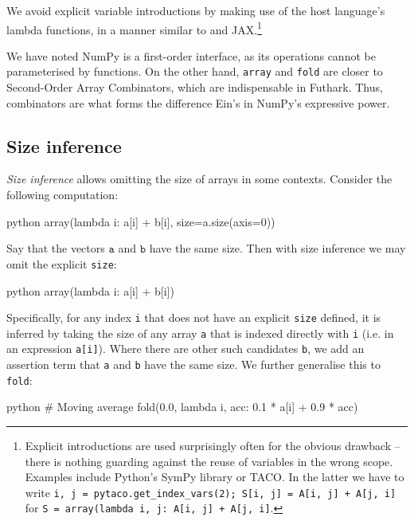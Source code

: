 We avoid explicit variable introductions by making use of the host language's lambda functions, in a manner similar to \textcite{atkey2009unembedding} and JAX.\footnote{Explicit introductions are used surprisingly often for the obvious drawback -- there is nothing guarding against the reuse of variables in the wrong scope. Examples include Python's SymPy library or TACO. In the latter we have to write \texttt{i, j = pytaco.get_index_vars(2); S[i, j] = A[i, j] + A[j, i]} for \texttt{S = array(lambda i, j: A[i, j] + A[j, i]}.}

We have noted NumPy is a first-order interface, as its operations cannot be parameterised by functions. On the other hand, \texttt{array} and \texttt{fold} are closer to Second-Order Array Combinators, which are indispensable in Futhark.
Thus, combinators are what forms the difference Ein's in NumPy's expressive power.



\subsection{Size inference}

\textit{Size inference} allows omitting the size of arrays in some contexts. Consider the following computation:
\begin{center} 
\begin{cminted}{python}
array(lambda i: a[i] + b[i], size=a.size(axis=0))
\end{cminted} 
\end{center}
Say that the vectors $\texttt{a}$ and $\texttt{b}$ have the same size. Then with size inference we may omit the explicit \texttt{size}:
\begin{center} 
\begin{cminted}{python}
array(lambda i: a[i] + b[i])
\end{cminted} 
\end{center}
Specifically, for any index \texttt{i} that does not have an explicit \texttt{size} defined, it is inferred by taking the size of any array \texttt{a} that is indexed directly with \texttt{i} (i.e. in an expression \texttt{a[i]}). 
Where there are other such candidates \texttt{b}, we add an assertion term that \texttt{a} and \texttt{b} have the same size. We further generalise this to \texttt{fold}:
\begin{center}
\begin{cminted}{python}
# Moving average
fold(0.0, lambda i, acc: 0.1 * a[i] + 0.9 * acc)
\end{cminted}
\end{center}

